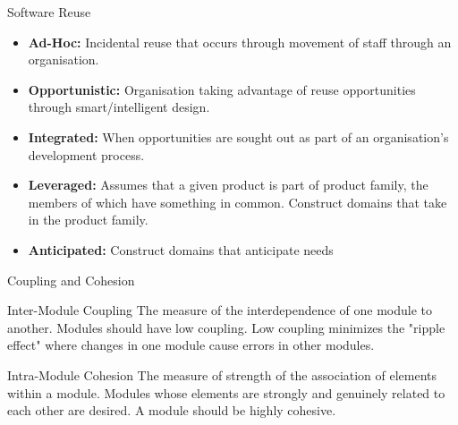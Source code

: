 \documentclass[aspectratio=1610,xcolor=dvipsnames,t,compress]{beamer}
\begin{document}
\begin{frame}{Software Reuse} 
    \begin{itemize}
        \item \textbf{Ad-Hoc:} Incidental reuse that occurs through 
              movement of staff through an organisation.
        \item \textbf{Opportunistic:} Organisation taking advantage of reuse 
              opportunities through smart/intelligent design.
          \item \textbf{Integrated:} When opportunities are sought out as 
              part of an organisation’s development process.
          \item \textbf{Leveraged:} Assumes that a given product is part of 
              product family, the members of which have something in common. 
              Construct domains that take in the product family.
          \item \textbf{Anticipated:} Construct domains that anticipate needs
    \end{itemize}
\end{frame} 

\begin{frame}{Coupling and Cohesion} 
    \begin{block}{Inter-Module Coupling} 
        The measure of the interdependence of one module to another. 
        Modules should have low coupling. 
        Low coupling minimizes the "ripple effect" where changes 
        in one module cause errors in other modules. 
    \end{block} 

    \begin{block}{Intra-Module Cohesion} 
        The measure of strength of the association of elements within a module. 
        Modules whose elements are strongly and genuinely related to 
        each other are desired. A module should be highly cohesive. 
    \end{block} 

\end{frame} 
\end{document}
